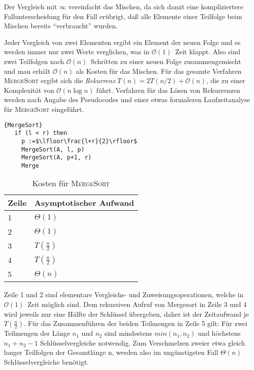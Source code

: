 \documentclass[ngerman,draft,parskip=half*,twoside]{scrreprt}
\theoremstyle{break}
\theoremstyle{nonumberbreak}
\newcommand*{\OO}{\mathcal{O}}      %
\begin{document}
Der Vergleich mit $\infty$ vereinfacht das Mischen, da sich damit eine kompliziertere Fallunterscheidung für den Fall erübrigt, 
daß alle Elemente einer Teilfolge beim Mischen bereits "`verbraucht"' wurden.

Jeder Vergleich von zwei Elementen ergibt ein Element der neuen Folge und es werden immer nur zwei Werte verglichen, was in
$\OO(1)$~Zeit klappt. Also sind zwei Teilfolgen nach $\OO(n)$~Schritten zu einer neuen Folge zusammengemischt und man erhält
$\OO(n)$ als Kosten für das Mischen.
Für das gesamte Verfahren \textsc{MergeSort} ergibt sich die \textit{Rekurrenz} $T(n)=2T(n/2)+\OO(n)$, die zu einer Komplexität von $\OO(n
\log n)$ führt. Verfahren für das Lösen von Rekurrenzen werden nach Angabe des Pseudocodes und einer etwas
formaleren Laufzeitanalyse für \textsc{MergeSort} eingeführt.

%
\begin{Algorithmus}[h]
    \begin{lstlisting}[frame=tlrb, mathescape=true, title=\textsc{MergeSort}, gobble=3]{MergeSort}   
   if (l < r) then
     p :=$\lfloor\frac{l+r}{2}\rfloor$ 
     MergeSort(A, l, p)
     MergeSort(A, p+1, r)
     Merge
    \end{lstlisting}
  \end{Algorithmus}
  
\begin{table}[h]
  \begin{tabular}{*{2}{l}}
    Zeile & Asymptotischer Aufwand\\
    \hline
    1 & $\Theta(1)$\\
    2 & $\Theta(1)$\\
    3 & $T(\frac{n}{2})$\\
    4 & $T(\frac{n}{2})$\\
    5 & $\Theta(n)$\\
  \end{tabular}
  \caption{Kosten für \textsc{MergeSort}} 
\end{table}

Zeile 1 und 2 sind elementare Vergleichs- und Zuweisungsoperationen, welche in $\OO(1)$~Zeit möglich sind. 
Dem rekursiven Aufruf von Mergesort in Zeile 3 und 4 wird jeweils nur eine Hälfte der Schlüssel übergeben, 
daher ist der Zeitaufwand je $T(\frac{n}{2})$. Für das Zusammenführen der beiden Teilmengen in Zeile 5 gilt: 
Für zwei Teilmengen der Länge $n_1$ und $n_2$ sind mindestens $min(n_1,n_2)$ und höchstens $n_1 + n_2 -1$ Schlüsselvergleiche notwendig. 
Zum Verschmelzen zweier etwa gleich langer Teilfolgen der Gesamtlänge n, werden also im ungünstigsten Fall $\Theta(n)$ Schlüsselvergleiche benötigt.
\end{document}
